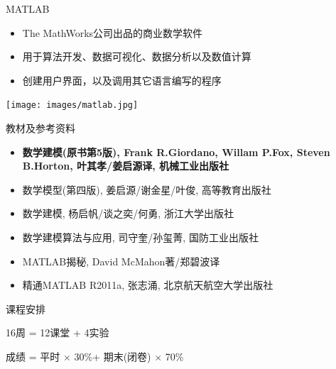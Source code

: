 \documentclass[
  ignorenonframetext,
]{ctexbeamer}
\providecommand{\tightlist}{%
  \setlength{\itemsep}{0pt}\setlength{\parskip}{0pt}}\usepackage{longtable,booktabs,array}
\begin{document}
\begin{frame}{MATLAB}
\label{matlab}
\begin{itemize}
\tightlist
\item
  The MathWorks公司出品的商业数学软件
\item
  用于算法开发、数据可视化、数据分析以及数值计算
\item
  创建用户界面，以及调用其它语言编写的程序
\end{itemize}

\begin{center}
\texttt{[image: images/matlab.jpg]}
\end{center}
\end{frame}

\begin{frame}{教材及参考资料}
\label{ux6559ux6750ux53caux53c2ux8003ux8d44ux6599}
\begin{itemize}
\tightlist
\item
  \textbf{数学建模(原书第5版), Frank R.Giordano, Willam P.Fox, Steven
  B.Horton, 叶其孝/姜启源译, 机械工业出版社}
\item
  数学模型(第四版), 姜启源/谢金星/叶俊, 高等教育出版社
\item
  数学建模, 杨启帆/谈之奕/何勇, 浙江大学出版社
\item
  数学建模算法与应用, 司守奎/孙玺菁, 国防工业出版社
\item
  MATLAB揭秘, David McMahon著/郑碧波译
\item
  精通MATLAB R2011a, 张志涌, 北京航天航空大学出版社
\end{itemize}
\end{frame}

\begin{frame}{课程安排}
\label{ux8bfeux7a0bux5b89ux6392}
\begin{description}
\tightlist
\item[时间]
16周 = 12课堂 + 4实验
\item[考试]
成绩 = 平时 \(\times\) 30\%+ 期末(闭卷) \(\times\) 70\%
\end{description}
\end{frame}
\end{document}
